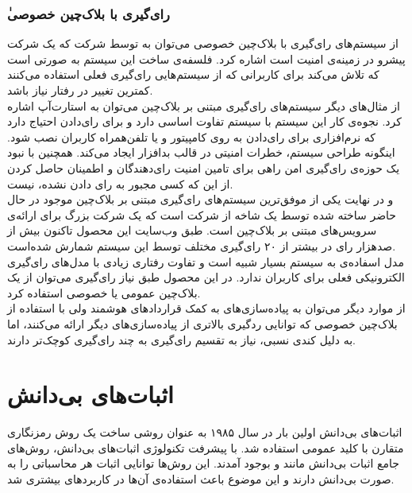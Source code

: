 \subsubsection{ٰرای‌گیری با بلاک‌چین خصوصی}
از سیستم‌های رای‌گیری با بلاک‌چین خصوصی می‌توان به 
\cite{votebook}
توسط شرکت 
که یک شرکت پیشرو در زمینه‌ی امنیت است اشاره کرد. فلسفه‌ی ساخت این سیستم به صورتی است که تلاش می‌کند برای کاربرانی که از سیستم‌هایی رای‌گیری فعلی استفاده می‌کنند کمترین تغییر در رفتار نیاز باشد. 
\\
از مثال‌های دیگر سیستم‌های رای‌گیری مبتنی بر بلاک‌چین می‌توان به استارت‌آپ 
اشاره کرد. نجوه‌ی کار این سیستم با سیستم 
تفاوت اساسی دارد و برای رای‌دادن احتیاج دارد که نرم‌‌افزاری برای رای‌دادن به روی کامپیتور و یا تلفن‌همراه کاربران نصب شود. اینگونه طراحی سیستم،‌ خطرات امنیتی در قالب بدافزار ایجاد می‌کند. همچنین با نبود یک حوزه‌ی رای‌گیری امن راهی برای تامین امنیت رای‌دهندگان و اطمینان حاصل کردن از این که کسی مجبور به رای‌ دادن نشده، نیست.
\\
و در نهایت یکی از موفق‌ترین سیستم‌های رای‌گیری مبتنی بر بلاک‌چین موجود در حال حاضر 
ساخته شده توسط یک شاخه از شرکت 
است که یک شرکت بزرگ برای ارائه‌ی سرویس‌های مبتنی بر بلاک‌چین است. طبق وب‌سایت این محصول تاکنون بیش از صدهزار رای در بیشتر از ۲۰ رای‌گیری مختلف توسط این سیستم‌ شمارش شده‌است. 
\\
مدل اسفاده‌ی 
به سیستم‌ 
بسیار شبیه است و تفاوت رفتاری زیادی با مدل‌های رای‌گیری الکترونیکی فعلی برای کاربران ندارد. در این محصول طبق نیاز رای‌گیری می‌توان از یک بلاک‌چین عمومی یا خصوصی استفاده کرد.
\\
از موارد دیگر می‌توان به پیاده‌سازی‌های به کمک قرارداد‌های هوشمند ولی با استفاده از بلاک‌چین خصوصی 
\cite{privblock}
که توانایی ردگیری بالاتری از پیاده‌سازی‌های دیگر ارائه می‌کنند، اما به دلیل کندی نسبی، نیاز به تقسیم رای‌گیری به چند رای‌گیری کوچک‌تر دارند.

\section{اثبات‌های بی‌دانش}
اثبات‌های بی‌دانش اولین بار در سال ۱۹۸۵ 
\cite{GHY}
به عنوان روشی ساخت یک روش رمزنگاری متقارن با کلید عمومی استفاده شد. با پیشرفت تکنولوژی اثبات‌های بی‌دانش،‌ روش‌های جامع اثبات بی‌دانش مانند
\cite{zksnark}
و  
\cite{zkstark}
بوجود آمدند. این روش‌ها توانایی اثبات هر محاسباتی را به صورت بی‌دانش دارند و این موضوع باعث استفاده‌ی آن‌ها در کاربردهای بیشتری شد.
